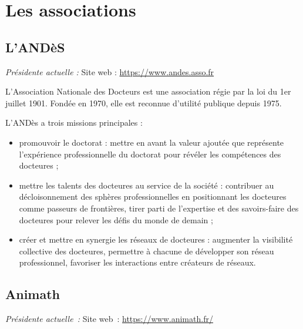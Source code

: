 \chapter{Les associations}


\section{L'AND\`eS}

\emph{Pr\'esident\mp e actuel\mp le : } \hfill Site web : \url{https://www.andes.asso.fr}
\smallskip

L'Association Nationale des Docteurs est une association r\'egie par la loi du 1er juillet 1901.
Fond\'ee en 1970, elle est reconnue d'utilit\'e publique depuis 1975.

L'AND\`es a trois missions principales :
\begin{itemize}
\item promouvoir le doctorat : mettre en avant la valeur ajout\'ee que repr\'esente l'exp\'erience professionnelle du doctorat pour r\'ev\'eler les comp\'etences des docteur\mp e\mp s ;
\item mettre les talents des docteur\mp e\mp s au service de la soci\'et\'e : contribuer au d\'ecloisonnement des sph\`eres professionnelles en positionnant les docteur\mp e\mp s comme \og{}passeurs de fronti\`eres\fg{},
    tirer parti de l'expertise et des savoirs-faire des docteur\mp e\mp s pour relever les d\'efis du monde de demain ;
\item cr\'eer et mettre en synergie les r\'eseaux de docteur\mp e\mp s : augmenter la visibilit\'e collective des docteur\mp e\mp s,
    permettre \`a chacun\mp e de d\'evelopper son r\'eseau professionnel,
    favoriser les interactions entre cr\'eateurs de r\'eseaux.
\end{itemize}


\section{Animath}
\label{animath}
 
\emph{Pr\'esident\mp e actuel\mp le~: } \hfill Site web~: \url{https://www.animath.fr/}
\smallskip

